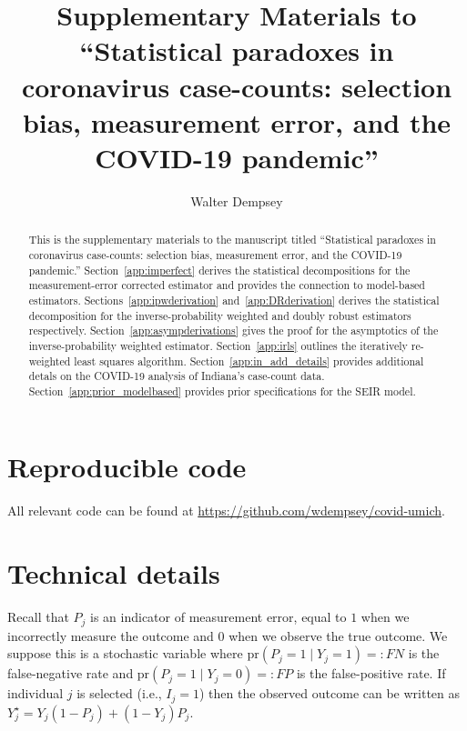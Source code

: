 \documentclass[11pt]{amsart}
\numberwithin{equation}{section}
\theoremstyle{plain}
\def\pr{\text{pr}}
\begin{document}
\title[Statistical paradoxes in coronavirus case-counts]{Supplementary Materials to ``Statistical paradoxes in coronavirus case-counts: selection bias, measurement error, and the COVID-19 pandemic''} %

\author{Walter Dempsey}
\address{Department of Biostatistics, University of Michigan, Ann Arbor, MI 48109}

\begin{abstract}
This is the supplementary materials to the manuscript titled ``Statistical paradoxes in coronavirus case-counts: selection bias, measurement error, and the COVID-19 pandemic.''  Section~\ref{app:imperfect} derives the statistical decompositions for the measurement-error corrected estimator and provides the connection to model-based estimators. Sections~\ref{app:ipwderivation} and~\ref{app:DRderivation} derives the statistical decomposition for the inverse-probability weighted and doubly robust estimators respectively.
Section~\ref{app:asympderivations} gives the proof for the asymptotics of the inverse-probability weighted estimator.  
Section~\ref{app:irls} outlines the iteratively re-weighted least squares algorithm.
Section~\ref{app:in_add_details} provides additional detals on the COVID-19 analysis of Indiana's case-count data.
Section~\ref{app:prior_modelbased} provides prior specifications for the SEIR model.
\end{abstract}

\maketitle

\newpage
\appendix

\section{Reproducible code}

All relevant code can be found at \url{https://github.com/wdempsey/covid-umich}.

\section{Technical details}

Recall that $P_j$ is  an indicator of measurement error, equal to $1$ when we incorrectly measure the outcome and $0$ when we observe the true outcome. We suppose this is a stochastic variable where $\pr(P_j = 1 \mid Y_j = 1) =: FN$ is the false-negative rate and $\pr(P_j = 1 \mid Y_j = 0) =: FP$ is the false-positive rate.  If individual $j$ is selected (i.e., $I_j = 1$) then the observed outcome can be written as $Y_j^{\star} = Y_j(1-P_j) + (1-Y_j) P_j$.
\end{document}
